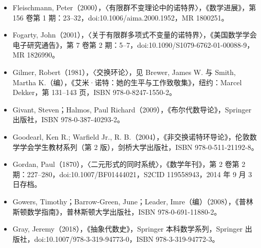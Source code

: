 \begin{itemize}
\item Fleischmann, Peter（2000），〈有限群不变理论中的诺特界〉，《数学进展》，第 156 卷第 1 期：23–32，doi:10.1006/aima.2000.1952，MR 1800251。
\item Fogarty, John（2001），〈关于有限群多项式不变量的诺特界〉，《美国数学学会电子研究通告》，第 7 卷第 2 期：5–7，doi:10.1090/S1079-6762-01-00088-9，MR 1826990。
\item Gilmer, Robert（1981），〈交换环论〉，见 Brewer, James W. 与 Smith, Martha K.（编），《艾米·诺特：她的生平与工作致敬集》，纽约：Marcel Dekker，第 131–143 页，ISBN 978-0-8247-1550-2。
\item Givant, Steven；Halmos, Paul Richard（2009），《布尔代数导论》，Springer 出版社，ISBN 978-0-387-40293-2。
\item Goodearl, Ken R.; Warfield Jr., R. B.（2004），《非交换诺特环导论》，伦敦数学学会学生教材系列（第 2 版），剑桥大学出版社，ISBN 978-0-511-21192-8。
\item Gordan, Paul（1870），〈二元形式的同时系统〉，《数学年刊》，第 2 卷第 2 期：227–280，doi:10.1007/BF01444021，S2CID 119558943，2014 年 9 月 3 日存档。
\item Gowers, Timothy；Barrow-Green, June；Leader, Imre（编）（2008），《普林斯顿数学指南》，普林斯顿大学出版社，ISBN 978-0-691-11880-2。
\item Gray, Jeremy（2018），《抽象代数史》，Springer 本科数学系列，Springer 出版社，doi:10.1007/978-3-319-94773-0，ISBN 978-3-319-94772-3。

\end{itemize}